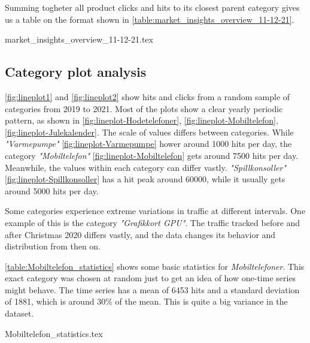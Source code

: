 Summing togheter all product clicks and hits to its closest parent category
gives us a table on the format shown in \autoref{table:market_insights_overview_11-12-21}.

{market_insights_overview_11-12-21.tex}

\subsection{Category plot analysis}
\autoref{fig:lineplot1} and \autoref{fig:lineplot2} show hits and clicks
from a random sample of categories from 2019 to 2021.
Most of the plots show a clear yearly periodic pattern, as shown in 
\autoref{fig:lineplot-Hodetelefoner},
\autoref{fig:lineplot-Mobiltelefon},
\autoref{fig:lineplot-Julekalender}.
The scale of values differs between categories.
While \textit{"Varmepumpe"} \autoref{fig:lineplot-Varmepumpe} hower around 1000 hits per day,
the category \textit{"Mobiltelefon"} \autoref{fig:lineplot-Mobiltelefon} gets around 7500 hits per day.
Meanwhile, the values within each category can differ vastly.
\textit{"Spillkonsoller"} \autoref{fig:lineplot-Spillkonsoller} has a hit peak around 60000,
while it usually gets around 5000 hits per day.

Some categories experience extreme variations in traffic at different intervals.
One example of this is the category \textit{"Grafikkort GPU"}.
The traffic tracked before and after Christmas 2020 differs vastly,
and the data changes its behavior and distribution from then on.

\autoref{table:Mobiltelefon_statistics} shows some basic statistics for \textit{Mobiltelefoner}.
This exact category was chosen at random just to get an idea of how one-time series might behave.
The time series has a mean of 6453 hits and a standard deviation of 1881, which is
around 30\% of the mean. This is quite a big variance in the dataset.

{Mobiltelefon_statistics.tex}

